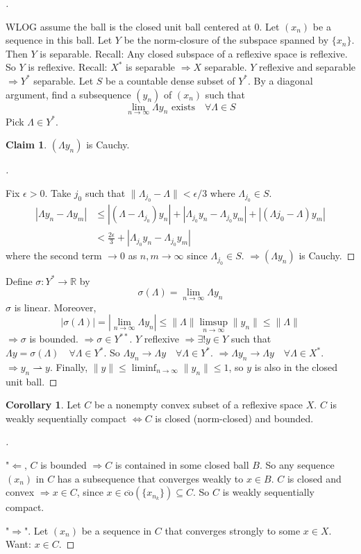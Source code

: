 \documentclass{article}
\theoremstyle{definition}
\newtheorem{cor}{Corollary}
\newtheorem*{clm}{Claim}
\newenvironment{proofs}[1][\proofname]{%
  \begin{proof}[#1]$ $\par\nobreak\ignorespaces
}{%
  \end{proof}
}
\newcommand{\RR}{\mathbb R}
\newcommand{\Ra}{\Rightarrow}
\newcommand{\La}{\Leftarrow}
\newcommand{\Lra}{\Leftrightarrow}
\newcommand{\ru}{\rightharpoonup}
\begin{document}
\begin{proofs}
	WLOG assume the ball is the closed unit ball centered at 0.
	Let $(x_n)$ be a sequence in this ball.
	Let $Y$ be the norm-closure of the subspace spanned by $\{x_n\}$.
	Then $Y$ is separable.
	Recall: Any closed subspace of a reflexive space is reflexive.
	So $Y$ is reflexive.
	Recall: $X^*$ is separable $\Ra X$ separable.
	$Y$ reflexive and separable $\Ra Y^*$ separable.
	Let $S$ be a countable dense subset of $Y^*$.
	By a diagonal argument, find a subsequence $(y_n)$ of $(x_n)$ such that
	\[
		\lim_{n \to \infty} \Lambda y_n \text{ exists} \quad \forall \Lambda \in S
	\]
	Pick $\Lambda \in Y^*$.
	\begin{clm}
		$(\Lambda y_n)$ is Cauchy.
	\end{clm}
	\begin{proofs}
		Fix $\epsilon > 0$.
		Take $j_0$ such that $\|\Lambda_{j_0} - \Lambda\| < \epsilon/3$ where $\Lambda_{j_0} \in S$.
		\[
			\begin{split}
				|\Lambda y_n - \Lambda y_m| & \leq |(\Lambda - \Lambda_{j_0}) y_n| + |\Lambda_{j_0} y_n - \Lambda_{j_0} y_m| + |(\Lambda j_0 - \Lambda) y_m|\\
				&< \frac{2 \epsilon}{3} + |\Lambda_{j_0} y_n - \Lambda_{j_0} y_m|
			\end{split}
		\]
		where the second term $\to 0$ as $n, m \to \infty$ since $\Lambda_{j_0} \in S$.
		$\Ra (\Lambda y_n)$ is Cauchy.
	\end{proofs}
	Define $\sigma: Y^* \to \RR$ by
	\[
		\sigma(\Lambda) = \lim_{n \to \infty} \Lambda y_n
	\]
	$\sigma$ is linear.
	Moreover, 
	\[
		|\sigma(\Lambda)| = \left|\lim_{n \to \infty} \Lambda y_n\right| \leq \|\Lambda \| \limsup_{n \to \infty} \|y_n\| \leq \|\Lambda\|
	\]
	$\Ra \sigma$ is bounded.
	$\Ra \sigma \in Y^{**}$.
	$Y$ reflexive $\Ra \exists ! y \in Y$ such that $\Lambda y = \sigma(\Lambda) \quad \forall \Lambda \in Y^*$.
	So $\Lambda y_n \to \Lambda y \quad \forall \Lambda \in Y^*$.
	$\Ra \Lambda y_n \to \Lambda y \quad \forall \Lambda \in X^*$.
	$\Ra y_n \ru y$.
	Finally, $\|y\| \leq \liminf_{n \to \infty} \|y_n\| \leq 1$, so $y$ is also in the closed unit ball.
\end{proofs}

\begin{cor}
	Let $C$ be a nonempty convex subset of a reflexive space $X$.
	$C$ is weakly sequentially compact $\Lra C$ is closed (norm-closed) and bounded.
\end{cor}

\begin{proofs}
	"$\La$, $C$ is bounded $\Ra C$ is contained in some closed ball $B$.
	So any sequence $(x_n)$ in $C$ has a subsequence that converges weakly to $x \in B$.
	$C$ is closed and convex $\Ra x \in C$, since $x \in \overline{\text{co}}(\{x_{n_k}\}) \subseteq C$.
	So $C$ is weakly sequentially compact.
	\par "$\Ra$". Let $(x_n)$ be a sequence in $C$ that converges strongly to some $x \in X$.
	Want: $x \in C$.
\end{proofs}
\end{document}
